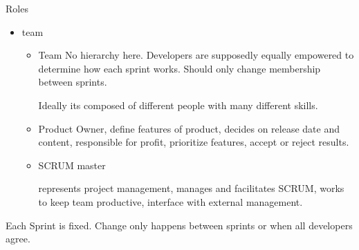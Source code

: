 \documentclass{report}
\begin{document}
Roles
\begin{mdframed}
    \begin{itemize}
        \item team
            \begin{itemize}
                \item Team
                    No hierarchy here. Developers are supposedly equally
                    empowered to determine how each sprint works. Should
                    only change membership between sprints.

                    Ideally its composed of different people with many different
                    skills.

                \item Product Owner, define features of product, decides
                    on release date and content, responsible for profit,
                    prioritize features, accept or reject results.
                \item SCRUM master

                    represents project management, manages and facilitates SCRUM,
                    works to keep team productive, interface with external management.
            \end{itemize}
    \end{itemize}
\end{mdframed}

Each Sprint is fixed. Change only happens between sprints
or when all developers agree.
\end{document}
